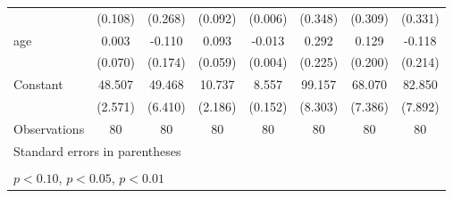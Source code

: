 \begin{table}[htbp]
\begin{tabular}{l*{7}{c}}
                    &     (0.108)         &     (0.268)         &     (0.092)         &     (0.006)         &     (0.348)         &     (0.309)         &     (0.331)         \\
\addlinespace
age                 &       0.003         &      -0.110         &       0.093         &      -0.013\sym{***}&       0.292         &       0.129         &      -0.118         \\
                    &     (0.070)         &     (0.174)         &     (0.059)         &     (0.004)         &     (0.225)         &     (0.200)         &     (0.214)         \\
\addlinespace
Constant            &      48.507\sym{***}&      49.468\sym{***}&      10.737\sym{***}&       8.557\sym{***}&      99.157\sym{***}&      68.070\sym{***}&      82.850\sym{***}\\
                    &     (2.571)         &     (6.410)         &     (2.186)         &     (0.152)         &     (8.303)         &     (7.386)         &     (7.892)         \\
\midrule
Observations        &          80         &          80         &          80         &          80         &          80         &          80         &          80         \\
\bottomrule
\multicolumn{8}{l}{\footnotesize Standard errors in parentheses}\\
\multicolumn{8}{l}{\footnotesize  }\\
\multicolumn{8}{l}{\footnotesize \sym{*} \(p<0.10\), \sym{**} \(p<0.05\), \sym{***} \(p<0.01\)}\\
\end{tabular}
\end{table}
